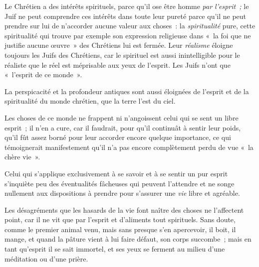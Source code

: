 \documentclass[french,twoside]{book} %
\begin{document}
Le Chrétien a des intérêts spirituels, parce qu’il ose être homme \emph{par l’esprit ;} le Juif ne peut comprendre ces intérêts dans toute leur pureté parce qu’il ne peut prendre sur lui de n’accorder aucune valeur aux choses : la \emph{spiritualité} pure, cette spiritualité qui trouve par exemple son expression religieuse dans « la foi que ne justifie aucune œuvre » des Chrétiens lui est fermée. Leur \emph{réalisme} éloigne toujours les Juifs des Chrétiens, car le spirituel est aussi inintelligible pour le réaliste que le réel est méprisable aux yeux de l’esprit. Les Juifs n’ont que « l’esprit de ce monde ».\par
La perspicacité et la profondeur antiques sont aussi éloignées de l’esprit et de la spiritualité du monde chrétien, que la terre l’est du ciel.\par
Les choses de ce monde ne frappent ni n’angoissent celui qui se sent un libre esprit ; il n’en a cure, car il  faudrait, pour qu’il continuât à sentir leur poids, qu’il fût assez borné pour leur accorder encore quelque importance, ce qui témoignerait manifestement qu’il n’a pas encore complètement perdu de vue « la chère vie ».\par
Celui qui s’applique exclusivement à se savoir et à se sentir un pur esprit s’inquiète peu des éventualités fâcheuses qui peuvent l’attendre et ne songe nullement aux dispositions à prendre pour s’assurer une \emph{vie} libre et agréable.\par
Les désagréments que les hasards de la vie font naître des choses ne l’affectent point, car il ne vit que par l’esprit et d’aliments tout spirituels. Sans doute, comme le premier animal venu, mais sans presque s’en apercevoir, il boit, il mange, et quand la pâture vient à lui faire défaut, son corps succombe ; mais en tant qu’esprit il se sait immortel, et ses yeux se ferment au milieu d’une méditation ou d’une prière.\par
\end{document}
